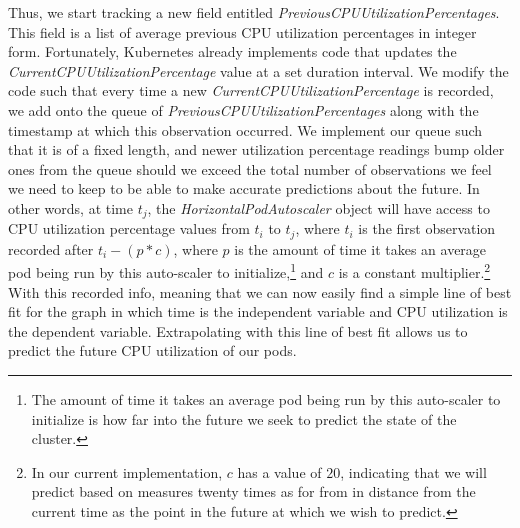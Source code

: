 Thus, we start tracking a new field entitled
\textit{PreviousCPUUtilizationPercentages}. This field is a list of average previous CPU
utilization percentages in integer form. Fortunately, Kubernetes already
implements code that updates the \textit{CurrentCPUUtilizationPercentage} value
at a set duration interval. We modify the code such that every time a new
\textit{CurrentCPUUtilizationPercentage} is recorded, we add onto the queue of
\textit{PreviousCPUUtilizationPercentages} along with the timestamp at which
this observation occurred. We implement our queue such that it
is of a fixed length, and newer utilization percentage readings bump older ones
from the queue should we exceed the total number of observations we feel we need
to keep to be able to make accurate predictions about the future. In other words, at time
$t_{j}$, the \textit{HorizontalPodAutoscaler} object will have access to
CPU utilization percentage values from $t_{i}$ to $t_{j}$, where $t_{i}$ is the
first observation recorded after $t_{i} - (p * c)$, where $p$ is the
amount of time it takes an
average pod being run by this auto-scaler to initialize,\footnote{The
amount of time it takes an
average pod being run by this auto-scaler to initialize is how far into the
future we seek to predict the state of the cluster.} and $c$ is a constant
multiplier.\footnote{In our current implementation, $c$ has a value of
$20$, indicating that we will predict based on measures twenty times as for from
in distance from the current time as the point in
the future at which we wish to predict.} With this recorded info,
meaning that we can now easily find a simple line of best fit
for the graph in which time is the independent variable and CPU utilization is
the dependent variable. Extrapolating with this line of best fit allows us to
predict the future CPU utilization of our pods.
